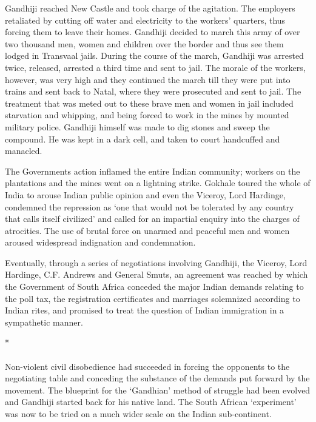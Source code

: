 \begin{multicols}{2}
Gandhiji reached New Castle and took charge of the agitation. The employers retaliated by cutting off water and electricity to the workers' quarters, thus forcing them to leave their homes. Gandhiji decided to march this army of over two thousand men, women and children over the border and thus see them lodged in Transvaal jails. During the course of the march, Gandhiji was arrested twice, released, arrested a third time and sent to jail. The morale of the workers, however, was very high and they continued the march till they were put into trains and sent back to Natal, where they were prosecuted and sent to jail. The treatment that was meted out to these brave men and women in jail included starvation and whipping, and being forced to work in the mines by mounted military police. Gandhiji himself was made to dig stones and sweep the compound. He was kept in a dark cell, and taken to court handcuffed and manacled.

The Governments action inflamed the entire Indian community; workers on the plantations and the mines went on a lightning strike. Gokhale toured the whole of India to arouse Indian public opinion and even the Viceroy, Lord Hardinge, condemned the repression as `one that would not be tolerated by any country that calls itself civilized' and called for an impartial enquiry into the charges of atrocities. The use of brutal force on unarmed and peaceful men and women aroused widespread indignation and condemnation.

Eventually, through a series of negotiations involving Gandhiji, the Viceroy, Lord Hardinge, C.F. Andrews and General Smuts, an agreement was reached by which the Government of South Africa conceded the major Indian demands relating to the poll tax, the registration certificates and marriages solemnized according to Indian rites, and promised to treat the question of Indian immigration in a sympathetic manner.

\begin{center}*\end{center}

\paragraph*{}
Non-violent civil disobedience had succeeded in forcing the opponents to the negotiating table and conceding the substance of the demands put forward by the movement. The blueprint for the `Gandhian' method of struggle had been evolved and Gandhiji started back for his native land. The South African `experiment' was now to be tried on a much wider scale on the Indian sub-continent.


\end{multicols}
